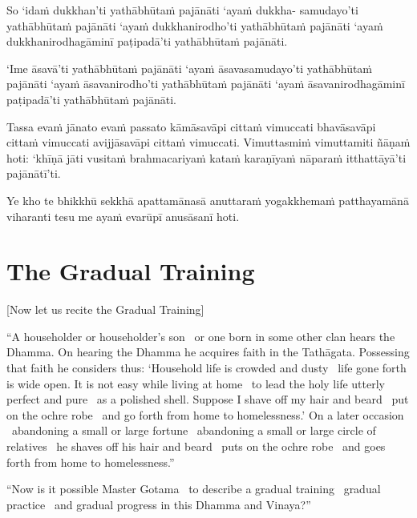 So ‘idaṁ dukkhan’ti yathābhūtaṁ pajānāti ‘ayaṁ dukkha- samudayo’ti yathābhūtaṁ pajānāti ‘ayaṁ dukkhanirodho’ti yathābhūtaṁ pajānāti ‘ayaṁ dukkhanirodhagāminī paṭipadā’ti yathābhūtaṁ pajānāti.

‘Ime āsavā’ti yathābhūtaṁ pajānāti ‘ayaṁ āsavasamudayo’ti yathābhūtaṁ pajānāti ‘ayaṁ āsavanirodho’ti yathābhūtaṁ pajānāti ‘ayaṁ āsavanirodhagāminī paṭipadā’ti yathābhūtaṁ pajānāti.

Tassa evaṁ jānato evaṁ passato kāmāsavāpi cittaṁ vimuccati bhavāsavāpi cittaṁ vimuccati avijjāsavāpi cittaṁ vimuccati. Vimuttasmiṁ vimuttamiti ñāṇaṁ hoti: ‘khīṇā jāti vusitaṁ brahmacariyaṁ kataṁ karaṇīyaṁ nāparaṁ itthattāyā’ti pajānātī’ti.

\suttaRef{[MN 39]}

Ye kho te bhikkhū sekkhā apattamānasā anuttaraṁ yogakkhemaṁ patthayamānā viharanti tesu me ayaṁ evarūpī anusāsanī hoti.

\suttaRef{[MN 107]}

\section{The Gradual Training}
\label{gradual-training}

\begin{center}
  [Now let us recite the Gradual Training]
\end{center}

\begin{justify}
“A householder or householder’s son \breathmark\ or one born in some other clan hears the Dhamma. On hearing the Dhamma he acquires faith in the Tathāgata. Possessing that faith he considers thus: ‘Household life is crowded and dusty \breathmark\ life gone forth is wide open. It is not easy while living at home \breathmark\ to lead the holy life utterly perfect and pure \breathmark\ as a polished shell. Suppose I shave off my hair and beard \breathmark\ put on the ochre robe \breathmark\ and go forth from home to homelessness.’ On a later occasion \breathmark\ abandoning a small or large fortune \breathmark\ abandoning a small or large circle of relatives \breathmark\ he shaves off his hair and beard \breathmark\ puts on the ochre robe \breathmark\ and goes forth from home to homelessness.”
\end{justify}

\suttaRef{[MN 27 / 38 / 51]}

\begin{justify}
“Now is it possible Master Gotama \breathmark\ to describe a gradual training \breathmark\ gradual practice \breathmark\ and gradual progress in this Dhamma and Vinaya?”
\end{justify}


